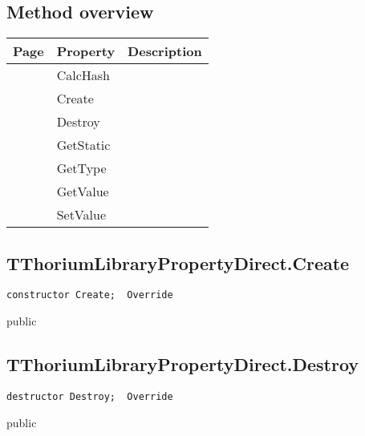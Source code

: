 \subsection{Method overview}
\label{thoriumcorepkg:thorium:tthoriumlibrarypropertydirect:methods}
\begin{tabularx}{\textwidth}{llX}
Page & Property & Description  \\ \hline
\pageref{thoriumcorepkg:thorium:tthoriumlibrarypropertydirect:calchash} & CalcHash  &  \\
\pageref{thoriumcorepkg:thorium:tthoriumlibrarypropertydirect:create} & Create  &  \\
\pageref{thoriumcorepkg:thorium:tthoriumlibrarypropertydirect:destroy} & Destroy  &  \\
\pageref{thoriumcorepkg:thorium:tthoriumlibrarypropertydirect:getstatic} & GetStatic  &  \\
\pageref{thoriumcorepkg:thorium:tthoriumlibrarypropertydirect:gettype} & GetType  &  \\
\pageref{thoriumcorepkg:thorium:tthoriumlibrarypropertydirect:getvalue} & GetValue  &  \\
\pageref{thoriumcorepkg:thorium:tthoriumlibrarypropertydirect:setvalue} & SetValue  &  \\
\hline
\end{tabularx}
\subsection{TThoriumLibraryPropertyDirect.Create}
\label{thoriumcorepkg:thorium:tthoriumlibrarypropertydirect:create}
\begin{FPCList}
\Declaration 

\begin{verbatim}
constructor Create;  Override
\end{verbatim}
\Visibility
public
\end{FPCList}
\subsection{TThoriumLibraryPropertyDirect.Destroy}
\label{thoriumcorepkg:thorium:tthoriumlibrarypropertydirect:destroy}
\begin{FPCList}
\Declaration 

\begin{verbatim}
destructor Destroy;  Override
\end{verbatim}
\Visibility
public
\end{FPCList}
